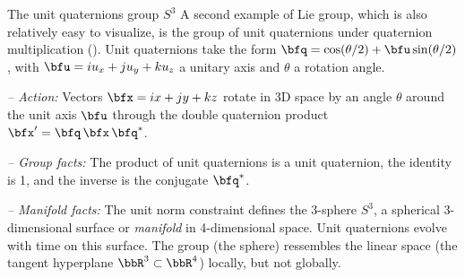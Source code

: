 
\begin{fexample}	{The unit quaternions group $S^3$}
\label{ex:S3_intro}
A second example of Lie group, which is also relatively easy to visualize, is the group of unit quaternions under quaternion multiplication ().
Unit quaternions take the form $\bfq=\cos(\theta/2)+\bfu\sin(\theta/2)$, with $\bfu=iu_x+ju_y+ku_z$ a unitary axis and $\theta$ a rotation angle.

\emph{-- Action:}
Vectors $\bfx=ix+jy+kz$ rotate in 3D space  by an angle $\theta$ around the unit axis $\bfu$ through the double quaternion product $\bfx'=\bfq\,\bfx\,\bfq^*$.

\emph{-- Group facts:} 
The product of unit quaternions is a unit quaternion, the identity is 1, and the inverse is the conjugate $\bfq^*$.

\emph{-- Manifold facts:} 
The unit norm constraint defines the 3-sphere $S^3$, a spherical 3-dimensional surface or \emph{manifold} in 4-dimensional space. 
Unit quaternions evolve with time on this surface.
The group (the sphere) ressembles the linear space (the tangent hyperplane $\bbR^3\subset\bbR^4$) locally, but not globally.
\end{fexample}
